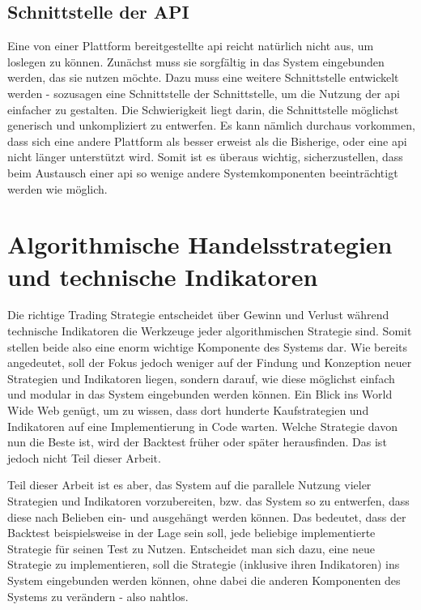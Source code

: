 \documentclass[oneside]{ausarbeitung}
\begin{document}
\subsection{Schnittstelle der API}
\label{sub:schnittstelle_der_api}

Eine von einer Plattform bereitgestellte \ac{api} reicht natürlich
nicht aus, um loslegen zu können. Zunächst muss sie sorgfältig in das
System eingebunden werden, das sie nutzen möchte. Dazu muss eine
weitere Schnittstelle entwickelt werden - sozusagen eine Schnittstelle
der Schnittstelle, um die Nutzung der \ac{api} einfacher zu gestalten.
Die Schwierigkeit liegt darin, die Schnittstelle möglichst generisch
und unkompliziert zu entwerfen. Es kann nämlich durchaus vorkommen,
dass sich eine andere Plattform als besser erweist als die Bisherige,
oder eine \ac{api} nicht länger unterstützt wird. Somit ist es
überaus wichtig, sicherzustellen, dass beim Austausch einer \ac{api}
so wenige andere Systemkomponenten beeinträchtigt werden wie
möglich.


\section{Algorithmische Handelsstrategien und technische Indikatoren}
\label{sec:strategie_und_indikatoren}

Die richtige Trading Strategie entscheidet über Gewinn und Verlust
während technische Indikatoren die Werkzeuge jeder algorithmischen
Strategie sind. Somit stellen beide also eine enorm wichtige
Komponente des Systems dar. Wie bereits angedeutet, soll der Fokus
jedoch weniger auf der Findung und Konzeption neuer Strategien und
Indikatoren liegen, sondern darauf, wie diese möglichst einfach und
modular in das System eingebunden werden können. Ein Blick ins World
Wide Web genügt, um zu wissen, dass dort hunderte Kaufstrategien und
Indikatoren auf eine Implementierung in Code warten. Welche Strategie
davon nun die Beste ist, wird der Backtest früher oder später
herausfinden. Das ist jedoch nicht Teil dieser Arbeit.

Teil dieser Arbeit ist es aber, das System auf die parallele Nutzung
vieler Strategien und Indikatoren vorzubereiten, bzw. das System so zu
entwerfen, dass diese nach Belieben ein- und ausgehängt werden
können. Das bedeutet, dass der Backtest beispielsweise in der Lage
sein soll, jede beliebige implementierte Strategie für seinen Test zu
Nutzen. Entscheidet man sich dazu, eine neue Strategie zu
implementieren, soll die Strategie (inklusive ihren Indikatoren) ins
System eingebunden werden können, ohne dabei die anderen Komponenten
des Systems zu verändern - also nahtlos. \\
\end{document}
